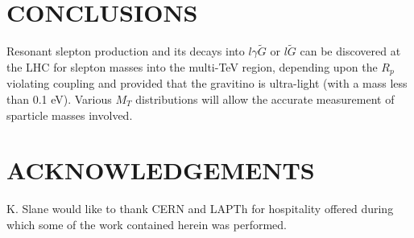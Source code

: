 \documentclass[11pt]{cernrep}
\begin{document}
\section*{CONCLUSIONS}
Resonant slepton production and its decays into $l \gamma {\tilde G}$ or $l
{\tilde G}$ can be discovered at the LHC for slepton masses into the multi-TeV
region, depending upon the $R_p$ violating coupling and provided that the gravitino is
ultra-light (with a mass less than 0.1 eV). Various $M_T$ distributions will
allow the accurate measurement of sparticle masses involved.


\section*{ACKNOWLEDGEMENTS}
K. Slane would like to thank CERN and LAPTh for hospitality offered
during which some of the work contained herein was performed.


\end{document}
